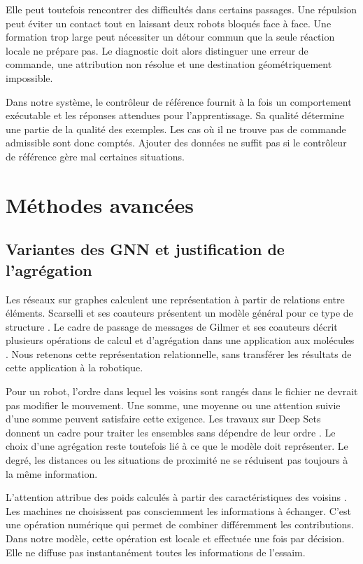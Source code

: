 Elle peut toutefois rencontrer des difficultés dans certains passages. Une répulsion peut éviter un contact tout en laissant deux robots bloqués face à face. Une formation trop large peut nécessiter un détour commun que la seule réaction locale ne prépare pas. Le diagnostic doit alors distinguer une erreur de commande, une attribution non résolue et une destination géométriquement impossible.

Dans notre système, le contrôleur de référence fournit à la fois un comportement exécutable et les réponses attendues pour l'apprentissage. Sa qualité détermine une partie de la qualité des exemples. Les cas où il ne trouve pas de commande admissible sont donc comptés. Ajouter des données ne suffit pas si le contrôleur de référence gère mal certaines situations.

\section{Méthodes avancées}
\subsection{Variantes des GNN et justification de l'agrégation}
Les réseaux sur graphes calculent une représentation à partir de relations entre éléments. Scarselli et ses coauteurs présentent un modèle général pour ce type de structure \cite{scarselli2009}. Le cadre de passage de messages de Gilmer et ses coauteurs décrit plusieurs opérations de calcul et d'agrégation dans une application aux molécules \cite{gilmer2017}. Nous retenons cette représentation relationnelle, sans transférer les résultats de cette application à la robotique.

Pour un robot, l'ordre dans lequel les voisins sont rangés dans le fichier ne devrait pas modifier le mouvement. Une somme, une moyenne ou une attention suivie d'une somme peuvent satisfaire cette exigence. Les travaux sur Deep Sets donnent un cadre pour traiter les ensembles sans dépendre de leur ordre \cite{zaheer2017}. Le choix d'une agrégation reste toutefois lié à ce que le modèle doit représenter. Le degré, les distances ou les situations de proximité ne se réduisent pas toujours à la même information.

L'attention attribue des poids calculés à partir des caractéristiques des voisins \cite{velickovic2018}. Les machines ne choisissent pas consciemment les informations à échanger. C'est une opération numérique qui permet de combiner différemment les contributions. Dans notre modèle, cette opération est locale et effectuée une fois par décision. Elle ne diffuse pas instantanément toutes les informations de l'essaim.

